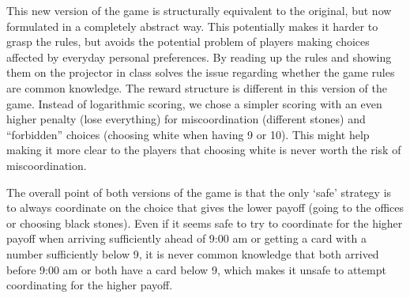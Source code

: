 This new version of the game is structurally equivalent to the original, but now formulated in a completely abstract way. This potentially makes it harder to grasp the rules, but avoids the potential problem of players making choices affected by everyday personal preferences. By reading up the rules and showing them on the projector in class solves the issue regarding whether the game rules are common knowledge. The reward structure is different in this version of the game. Instead of logarithmic scoring, we chose a simpler scoring with an even higher penalty (lose everything) for miscoordination (different stones) and ``forbidden'' choices (choosing white when having 9 or 10). This might help making it more clear to the players that choosing white is never worth the risk of miscoordination. %

The overall point of both versions of the game is that the only `safe' strategy is to always coordinate on the choice that gives the lower payoff (going to the offices or choosing black stones). Even if it seems safe to try to coordinate for the higher payoff when arriving sufficiently ahead of 9:00 am or getting a card with a number sufficiently below 9, it is never common knowledge that both arrived before 9:00 am or both have a card below 9, which makes it unsafe to attempt coordinating for the higher payoff. 




